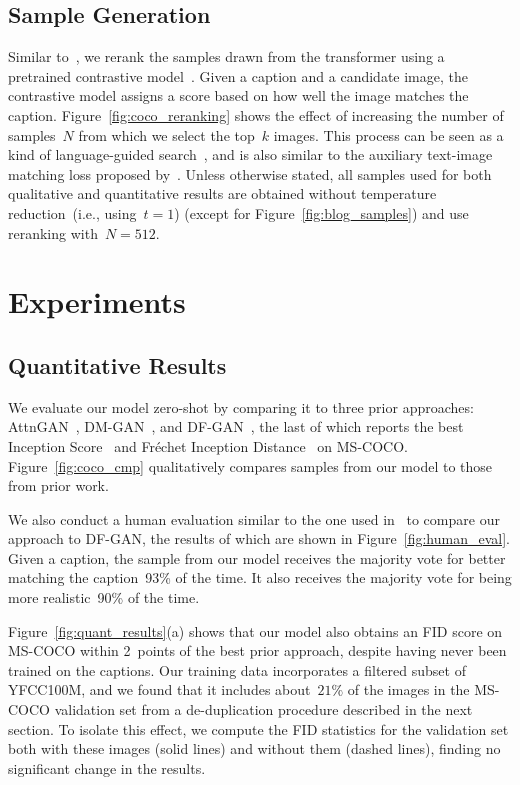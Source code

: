 \subsection{Sample Generation}

Similar to~\citet{razavi2019generating}, we rerank the samples drawn from the transformer using a pretrained contrastive model~\cite{radford2021learning}. Given a caption and a candidate image, the contrastive model assigns a score  based on how well the image matches the caption. Figure~\ref{fig:coco_reranking} shows the effect of increasing the number of samples~$N$ from which we select the top~$k$ images. This process can be seen as a kind of language-guided search~\cite{andreas2017learning}, and is also similar to the auxiliary text-image matching loss proposed by~\citet{xu2018attngan}. Unless otherwise stated, all samples used for both qualitative and quantitative results are obtained without temperature reduction~(i.e., using~$t=1$) (except for Figure~\ref{fig:blog_samples}) and use reranking with~$N = 512$.

\section{Experiments}
\label{sec:experiments}

\subsection{Quantitative Results}

We evaluate our model zero-shot by comparing it to three prior approaches: AttnGAN~\cite{xu2018attngan}, DM-GAN~\cite{zhu2019dm}, and DF-GAN~\cite{tao2020df}, the last of which reports the best Inception Score~\cite{salimans2016improved} and Fr\'echet Inception Distance~\cite{heusel2017gans} on MS-COCO. Figure~\ref{fig:coco_cmp} qualitatively compares samples from our model to those from prior work.

We also conduct a human evaluation similar to the one used in~\citet{koh2021text} to compare our approach to DF-GAN, the results of which are shown in Figure~\ref{fig:human_eval}. Given a caption, the sample from our model receives the majority vote for better matching the caption~93\% of the time. It also receives the majority vote for being more realistic~90\% of the time.

Figure~\ref{fig:quant_results}(a) shows that our model also obtains an FID score on MS-COCO within 2~points of the best prior approach, despite having never been trained on the captions. Our training data incorporates a filtered subset of YFCC100M, and we found that it includes about~$21\%$ of the images in the MS-COCO validation set from a de-duplication procedure described in the next section. To isolate this effect, we compute the FID statistics for the validation set both with these images (solid lines) and without them (dashed lines), finding no significant change in the results.

